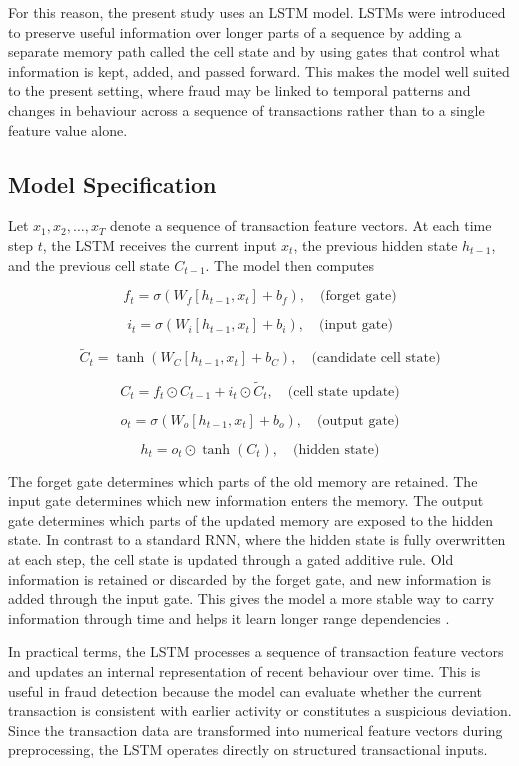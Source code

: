 \documentclass[oneside,12pt,parskip=half,american,numbers=noenddot]{scrreprt}
\begin{document}
For this reason, the present study uses an LSTM model. LSTMs were introduced to preserve useful information over longer parts of a sequence by adding a separate memory path called the cell state and by using gates that control what information is kept, added, and passed forward. This makes the model well suited to the present setting, where fraud may be linked to temporal patterns and changes in behaviour across a sequence of transactions rather than to a single feature value alone.

\subsection{Model Specification}

Let $x_1, x_2, \dots, x_T$ denote a sequence of transaction feature vectors. At each time step $t$, the LSTM receives the current input $x_t$, the previous hidden state $h_{t-1}$, and the previous cell state $C_{t-1}$. The model then computes

\[
f_t = \sigma \left( W_f [h_{t-1}, x_t] + b_f \right), \quad \text{(forget gate)}
\]

\[
i_t = \sigma \left( W_i [h_{t-1}, x_t] + b_i \right), \quad \text{(input gate)}
\]

\[
\tilde{C}_t = \tanh \left( W_C [h_{t-1}, x_t] + b_C \right), \quad \text{(candidate cell state)}
\]

\[
C_t = f_t \odot C_{t-1} + i_t \odot \tilde{C}_t, \quad \text{(cell state update)}
\]

\[
o_t = \sigma \left( W_o [h_{t-1}, x_t] + b_o \right), \quad \text{(output gate)}
\]

\[
h_t = o_t \odot \tanh(C_t), \quad \text{(hidden state)}
\]

The forget gate determines which parts of the old memory are retained. The input gate determines which new information enters the memory. The output gate determines which parts of the updated memory are exposed to the hidden state. In contrast to a standard RNN, where the hidden state is fully overwritten at each step, the cell state is updated through a gated additive rule. Old information is retained or discarded by the forget gate, and new information is added through the input gate. This gives the model a more stable way to carry information through time and helps it learn longer range dependencies \parencite{olah_understanding_2015}.

In practical terms, the LSTM processes a sequence of transaction feature vectors and updates an internal representation of recent behaviour over time. This is useful in fraud detection because the model can evaluate whether the current transaction is consistent with earlier activity or constitutes a suspicious deviation. Since the transaction data are transformed into numerical feature vectors during preprocessing, the LSTM operates directly on structured transactional inputs.
\end{document}
